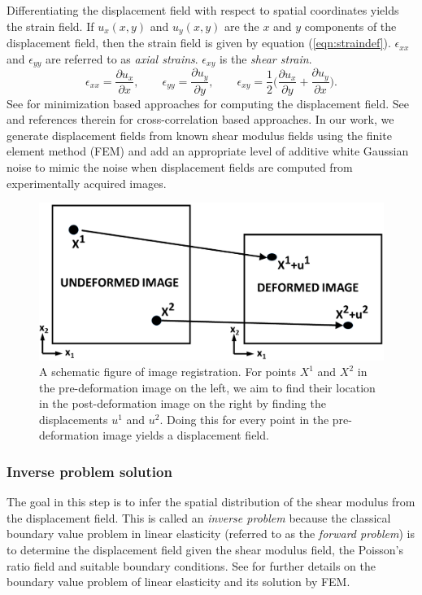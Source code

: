 \documentclass[12pt]{article}
\newcommand{\beq}{\begin{equation}}
\newcommand{\eeq}{\end{equation}}
\newcommand{\pdd}[2]{\frac{\partial{{#1}}}{\partial{#2}}}
\begin{document}
Differentiating the displacement field with respect to spatial coordinates yields the strain field. If $u_x(x,y)$ and $u_{y}(x,y)$ are the $x$ and $y$ components of the displacement field, then the strain field is given by equation (\ref{eqn:straindef}). $\epsilon_{xx}$ and $\epsilon_{yy}$ are referred to as \textit{axial strains}. $\epsilon_{xy}$ is the \textit{shear strain}.
\beq
\label{eqn:straindef}
\epsilon_{xx} = \pdd{u_{x}}{x}, \qquad \epsilon_{yy} = \pdd{u_{y}}{y}, \qquad \epsilon_{xy} = \frac{1}{2}\Big(\pdd{u_{x}}{y} + \pdd{u_{y}}{x}\Big).
\eeq
See \cite{paper:richards2009,paper:gokhale2004,paper:pellot-barakat2004} for minimization based approaches for computing the displacement field. See \cite{paper:ophir1991,paper:ophir1996,paper:alam1998} and references therein for cross-correlation based approaches. In our work, we generate displacement fields from known shear modulus fields using the finite element method (FEM) \cite{book:hugheslinear,book:fishbelytschko} and add an appropriate level of additive white Gaussian noise to mimic the noise when displacement fields are computed from experimentally acquired images. 
%
\begin{figure}[!h]
  \centering
  \includegraphics[totalheight=4cm]{Figures/registnew.png}
  \caption{\label{fig:registschematic} A schematic figure of image registration. For points $X^1$ and $X^2$ in the pre-deformation image on the left, we aim to find their location in the post-deformation image on the right by finding the displacements $u^1$ and $u^2$. Doing this for every point in the pre-deformation image yields a displacement field.}
\end{figure}
%
\subsubsection{Inverse problem solution} The goal in this step is to infer the spatial distribution of the shear modulus from the displacement field. This is called an \textit{inverse problem} because the classical boundary value problem in linear elasticity (referred to as the \textit{forward problem}) is to determine the displacement field given the shear modulus field, the Poisson's ratio field and suitable boundary conditions. See \cite{book:hugheslinear,book:fishbelytschko,book:segelmathcont} for further details on the boundary value problem of linear elasticity and its solution by FEM.
\end{document}
